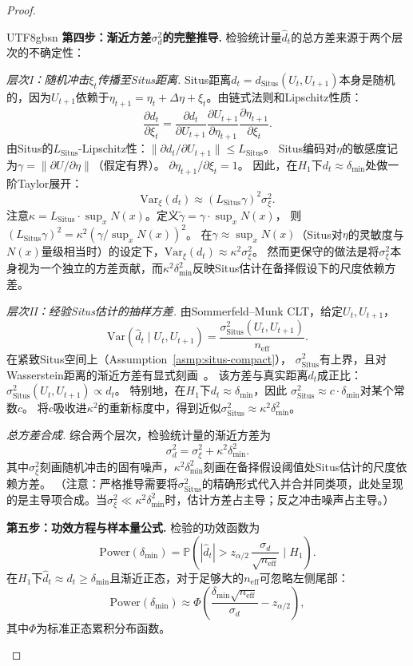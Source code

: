 \documentclass[12pt,a4paper]{article}
\newcommand{\Pp}{\mathbb{P}}
\newcommand{\Situs}{\mathrm{Situs}}
\begin{document}
\begin{proof}
\begin{CJK}{UTF8}{gbsn}
\medskip\noindent
\textbf{第四步：渐近方差$\sigma_d^2$的完整推导.}
检验统计量$\widehat{d}_t$的总方差来源于两个层次的不确定性：

\emph{层次I：随机冲击$\xi_t$传播至Situs距离.}
Situs距离$d_t = d_{\Situs}(U_t, U_{t+1})$本身是随机的，因为$U_{t+1}$依赖于$\eta_{t+1} = \eta_t + \Delta\eta + \xi_t$。由链式法则和Lipschitz性质：
\[
\frac{\partial d_t}{\partial \xi_t}
= \frac{\partial d_t}{\partial U_{t+1}}
\frac{\partial U_{t+1}}{\partial \eta_{t+1}}
\frac{\partial \eta_{t+1}}{\partial \xi_t}.
\]
由Situs的$L_{\Situs}$-Lipschitz性：$\|\partial d_t / \partial U_{t+1}\| \le L_{\Situs}$。
Situs编码对$\eta$的敏感度记为$\gamma = \|\partial U / \partial \eta\|$（假定有界）。
$\partial \eta_{t+1} / \partial \xi_t = 1$。
因此，在$H_1$下$d_t \approx \delta_{\min}$处做一阶Taylor展开：
\[
\text{Var}_{\xi}(d_t) \approx (L_{\Situs} \gamma)^2 \sigma_\xi^2.
\]
注意$\kappa = L_{\Situs} \cdot \sup_x N(x)$。定义$\tilde\gamma = \gamma \cdot \sup_x N(x)$，
则$(L_{\Situs}\gamma)^2 = \kappa^2 (\gamma / \sup_x N(x))^2$。
在$\gamma \approx \sup_x N(x)$（Situs对$\eta$的灵敏度与$N(x)$量级相当时）的设定下，$\text{Var}_{\xi}(d_t) \approx \kappa^2 \sigma_\xi^2$。
然而更保守的做法是将$\sigma_\xi^2$本身视为一个独立的方差贡献，而$\kappa^2\delta_{\min}^2$反映Situs估计在备择假设下的尺度依赖方差。

\emph{层次II：经验Situs估计的抽样方差.}
由Sommerfeld--Munk CLT，给定$U_t, U_{t+1}$，
\[
\text{Var}(\widehat{d}_t \mid U_t, U_{t+1})
= \frac{\sigma_{\Situs}^2(U_t, U_{t+1})}{n_{\text{eff}}}.
\]
在紧致Situs空间上（Assumption~\ref{asmp:situs-compact}），
$\sigma_{\Situs}^2$有上界，且对Wasserstein距离的渐近方差有显式刻画~\citep{sommerfeld2018inference}。
该方差与真实距离$d_t$成正比：$\sigma_{\Situs}^2(U_t, U_{t+1}) \propto d_t$。
特别地，在$H_1$下$d_t \approx \delta_{\min}$，因此
$\sigma_{\Situs}^2 \approx c \cdot \delta_{\min}$对某个常数$c$。
将$c$吸收进$\kappa^2$的重新标度中，得到近似$\sigma_{\Situs}^2 \approx \kappa^2 \delta_{\min}^2$。

\emph{总方差合成.}
综合两个层次，检验统计量的渐近方差为
\[
\sigma_d^2 = \sigma_\xi^2 + \kappa^2 \delta_{\min}^2.
\]
其中$\sigma_\xi^2$刻画随机冲击的固有噪声，$\kappa^2\delta_{\min}^2$刻画在备择假设阈值处Situs估计的尺度依赖方差。
（注意：严格推导需要将$\sigma_{\Situs}^2$的精确形式代入并合并同类项，此处呈现的是主导项合成。当$\sigma_\xi^2 \ll \kappa^2\delta_{\min}^2$时，估计方差占主导；反之冲击噪声占主导。）

\medskip\noindent
\textbf{第五步：功效方程与样本量公式.}
检验的功效函数为
\[
\text{Power}(\delta_{\min}) = \Pp\!\left(
|\widehat{d}_t| > z_{\alpha/2}\,\frac{\sigma_d}{\sqrt{n_{\text{eff}}}}
\;\Big|\; H_1
\right).
\]
在$H_1$下$\widehat{d}_t \approx d_t \ge \delta_{\min}$且渐近正态，对于足够大的$n_{\text{eff}}$可忽略左侧尾部：
\[
\text{Power}(\delta_{\min}) \approx
\Phi\!\left(
\frac{\delta_{\min}\sqrt{n_{\text{eff}}}}{\sigma_d} - z_{\alpha/2}
\right),
\]
其中$\Phi$为标准正态累积分布函数。


\end{CJK}
\end{proof}
\end{document}
